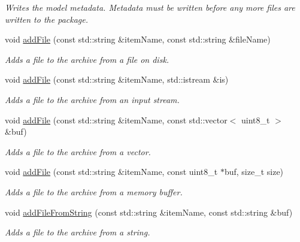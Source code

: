 \begin{DoxyCompactItemize}
\begin{DoxyCompactList}\small\item\em Writes the model metadata. Metadata must be written before any more files are written to the package. \end{DoxyCompactList}\item 
void \hyperlink{group___classification_module_gae289cee9ebc10a5cb834404c73e3dd7e}{add\+File} (const std\+::string \&item\+Name, const std\+::string \&file\+Name)
\begin{DoxyCompactList}\small\item\em Adds a file to the archive from a file on disk. \end{DoxyCompactList}\item 
void \hyperlink{group___classification_module_ga0f6ad9a470685adc23659eb7a3aa46eb}{add\+File} (const std\+::string \&item\+Name, std\+::istream \&is)
\begin{DoxyCompactList}\small\item\em Adds a file to the archive from an input stream. \end{DoxyCompactList}\item 
void \hyperlink{group___classification_module_gac4840a6a32e802a42f75732b2ec75de8}{add\+File} (const std\+::string \&item\+Name, const std\+::vector$<$ uint8\+\_\+t $>$ \&buf)
\begin{DoxyCompactList}\small\item\em Adds a file to the archive from a vector. \end{DoxyCompactList}\item 
void \hyperlink{group___classification_module_gafbcf569e170e01a25e9a1cc7a114a742}{add\+File} (const std\+::string \&item\+Name, const uint8\+\_\+t $\ast$buf, size\+\_\+t size)
\begin{DoxyCompactList}\small\item\em Adds a file to the archive from a memory buffer. \end{DoxyCompactList}\item 
void \hyperlink{group___classification_module_gaf0cf8086a94f63a55a3dedd710711c3d}{add\+File\+From\+String} (const std\+::string \&item\+Name, const std\+::string \&buf)
\begin{DoxyCompactList}\small\item\em Adds a file to the archive from a string. \end{DoxyCompactList}\end{DoxyCompactItemize}
